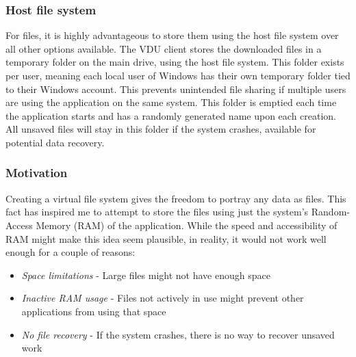 \subsubsection{Host file system}
For files, it is highly advantageous to store them using the host file system over all other options available. The VDU client stores the downloaded files in a temporary folder on the main drive, using the host file system. This folder exists per user, meaning each local user of Windows has their own temporary folder tied to their Windows account. This prevents unintended file sharing if multiple users are using the application on the same system. This folder is emptied each time the application starts and has a randomly generated name upon each creation. All unsaved files will stay in this folder if the system crashes, available for potential data recovery.

\subsubsection{Motivation}
Creating a virtual file system gives the freedom to portray any data as files. This fact has inspired me to attempt to store the files using just the system's Random-Access Memory (RAM) of the application. While the speed and accessibility of RAM might make this idea seem plausible, in reality, it would not work well enough for a couple of reasons:
\begin{itemize}
    \item \textit{Space limitations} - Large files might not have enough space
    \item \textit{Inactive RAM usage} - Files not actively in use might prevent other applications from using that space
    \item \textit{No file recovery} - If the system crashes, there is no way to recover unsaved work
\end{itemize}


